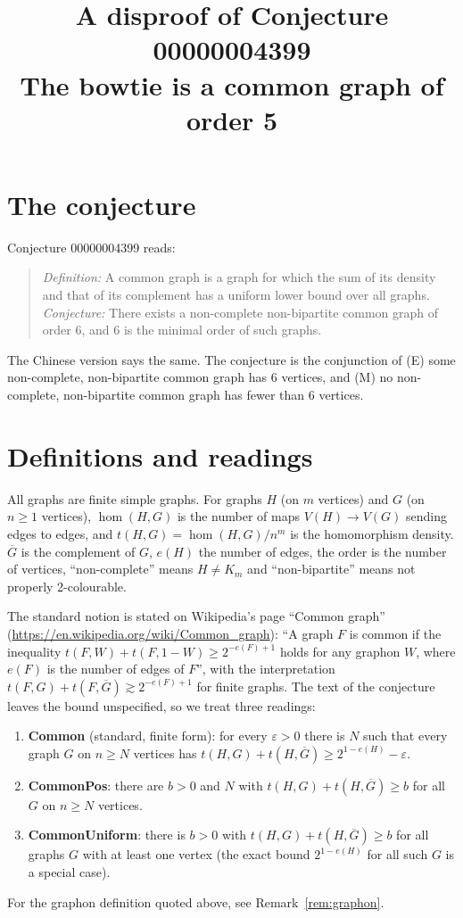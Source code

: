 \documentclass[11pt]{article}
\title{A disproof of Conjecture 00000004399\\[2pt]
\large The bowtie is a common graph of order 5}
\date{}
\theoremstyle{definition}
\theoremstyle{remark}
\renewcommand{\_}{\oldus\allowbreak}
\newcommand{\homc}{\operatorname{hom}}
\begin{document}
\sloppy
\maketitle

\section{The conjecture}

Conjecture 00000004399 reads:
\begin{quote}
\emph{Definition:} A common graph is a graph for which the sum of its density and that of its complement has a
uniform lower bound over all graphs. \emph{Conjecture:} There exists a non-complete non-bipartite common graph of
order 6, and 6 is the minimal order of such graphs.
\end{quote}
The Chinese version says the same. The conjecture is the conjunction of (E) some non-complete, non-bipartite
common graph has 6 vertices, and (M) no non-complete, non-bipartite common graph has fewer than 6 vertices.

\section{Definitions and readings}

All graphs are finite simple graphs. For graphs $H$ (on $m$ vertices) and $G$ (on $n\ge1$ vertices),
$\homc(H,G)$ is the number of maps $V(H)\to V(G)$ sending edges to edges, and $t(H,G)=\homc(H,G)/n^{m}$ is the
homomorphism density. $\overline G$ is the complement of $G$, $e(H)$ the number of edges, the order is the
number of vertices, ``non-complete'' means $H\ne K_m$ and ``non-bipartite'' means not properly 2-colourable.

The standard notion is stated on Wikipedia's page ``Common graph''
(\url{https://en.wikipedia.org/wiki/Common_graph}): ``A graph $F$ is common if the inequality
$t(F,W)+t(F,1-W)\ge 2^{-e(F)+1}$ holds for any graphon $W$, where $e(F)$ is the number of edges of $F$'', with the
interpretation $t(F,G)+t(F,\overline G)\gtrsim 2^{-e(F)+1}$ for finite graphs. The text of the conjecture leaves
the bound unspecified, so we treat three readings:
\begin{enumerate}[label=(\alph*)]
  \item \textbf{Common} (standard, finite form): for every $\varepsilon>0$ there is $N$ such that every graph $G$
        on $n\ge N$ vertices has $t(H,G)+t(H,\overline G)\ge 2^{1-e(H)}-\varepsilon$.
  \item \textbf{CommonPos}: there are $b>0$ and $N$ with $t(H,G)+t(H,\overline G)\ge b$ for all $G$ on $n\ge N$
        vertices.
  \item \textbf{CommonUniform}: there is $b>0$ with $t(H,G)+t(H,\overline G)\ge b$ for all graphs $G$ with at least
        one vertex (the exact bound $2^{1-e(H)}$ for all such $G$ is a special case).
\end{enumerate}
For the graphon definition quoted above, see Remark~\ref{rem:graphon}.
\end{document}
